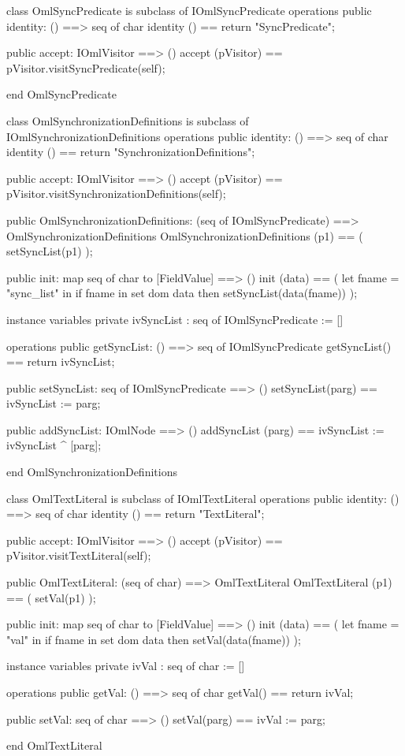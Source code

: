 \begin{vdm_al}
class OmlSyncPredicate is subclass of IOmlSyncPredicate
operations
  public identity: () ==> seq of char
  identity () == return "SyncPredicate";

  public accept: IOmlVisitor ==> ()
  accept (pVisitor) == pVisitor.visitSyncPredicate(self);

end OmlSyncPredicate
\end{vdm_al}
\begin{vdm_al}
class OmlSynchronizationDefinitions is subclass of IOmlSynchronizationDefinitions
operations
  public identity: () ==> seq of char
  identity () == return "SynchronizationDefinitions";

  public accept: IOmlVisitor ==> ()
  accept (pVisitor) == pVisitor.visitSynchronizationDefinitions(self);

  public OmlSynchronizationDefinitions:
      (seq of IOmlSyncPredicate) ==> OmlSynchronizationDefinitions
  OmlSynchronizationDefinitions (p1) == 
   ( setSyncList(p1) );

  public init: map seq of char to [FieldValue] ==> ()
  init (data) ==
    ( let fname = "sync_list" in
        if fname in set dom data
        then setSyncList(data(fname)) );

instance variables
  private ivSyncList : seq of IOmlSyncPredicate := []

operations
  public getSyncList: () ==> seq of IOmlSyncPredicate
  getSyncList() == return ivSyncList;

  public setSyncList: seq of IOmlSyncPredicate ==> ()
  setSyncList(parg) == ivSyncList := parg;

  public addSyncList: IOmlNode ==> ()
  addSyncList (parg) == ivSyncList := ivSyncList ^ [parg];

end OmlSynchronizationDefinitions
\end{vdm_al}

\begin{vdm_al}
class OmlTextLiteral is subclass of IOmlTextLiteral
operations
  public identity: () ==> seq of char
  identity () == return "TextLiteral";

  public accept: IOmlVisitor ==> ()
  accept (pVisitor) == pVisitor.visitTextLiteral(self);

  public OmlTextLiteral:
      (seq of char) ==> OmlTextLiteral
  OmlTextLiteral (p1) == 
   ( setVal(p1) );

  public init: map seq of char to [FieldValue] ==> ()
  init (data) ==
    ( let fname = "val" in
        if fname in set dom data
        then setVal(data(fname)) );

instance variables
  private ivVal : seq of char := []

operations
  public getVal: () ==> seq of char
  getVal() == return ivVal;

  public setVal: seq of char ==> ()
  setVal(parg) == ivVal := parg;

end OmlTextLiteral
\end{vdm_al}

